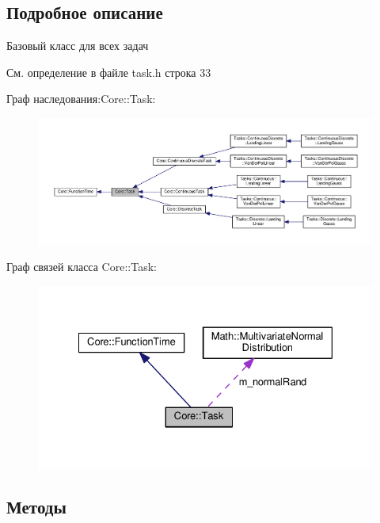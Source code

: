 \subsection{Подробное описание}
Базовый класс для всех задач 

См. определение в файле task.\+h строка 33



Граф наследования\+:Core\+:\+:Task\+:
\nopagebreak
\begin{figure}[H]
\begin{center}
\leavevmode
\includegraphics[width=350pt]{class_core_1_1_task__inherit__graph}
\end{center}
\end{figure}


Граф связей класса Core\+:\+:Task\+:
\nopagebreak
\begin{figure}[H]
\begin{center}
\leavevmode
\includegraphics[width=328pt]{class_core_1_1_task__coll__graph}
\end{center}
\end{figure}


\subsection{Методы}
